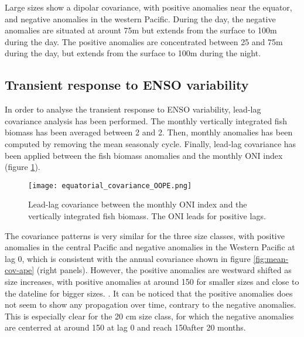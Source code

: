 Large sizes show a dipolar covariance, with positive anomalies near the equator, and negative anomalies in the western Pacific. 
During the day, the negative anomalies are situated at arount 75m but extends from the surface to 100m during the day. The positive anomalies are concentrated between 25 and 75m during the day, but extends from the surface to 100m during the night.

\subsection{Transient response to ENSO variability}

In order to analyse the transient response to ENSO variability, lead-lag covariance analysis has been performed. The monthly vertically integrated fish biomass has been averaged between 2\degS{} and 2\degN{}. Then, monthly anomalies has been computed by removing the mean seasonaly cycle. Finally, lead-lag covariance has been applied between the fish biomass anomalies and the monthly ONI index (figure \ref{fig:hov-cov-oope}).

\begin{figure}[h!]
    \centering
    \texttt{[image: equatorial\_covariance\_OOPE.png]}
    \caption{Lead-lag covariance between the monthly ONI index and the vertically integrated fish biomass. The ONI leads for positive lags.}
    \label{fig:hov-cov-oope}
\end{figure}

The covariance patterns is very similar for the three size classes, with
 positive anomalies in the central Pacific and negative
anomalies in the Western Pacific at lag 0, which is consistent 
with the annual covariance shown in figure \ref{fig:mean-cov-ape} (right panels). However, the positive anomalies are westward shifted as size increases, with positive anomalies at around 150\degW{} for smaller sizes and close to the dateline for bigger sizes. . It can be noticed that the positive anomalies does not seem to show any propagation over time, contrary to the negative anomalies. This is especially clear for the 20 cm size class, for which the negative anomalies are centerred at around 150\degE{} at lag 0 and reach 150\degW after 20 months.

 


%
%

\clearpage
